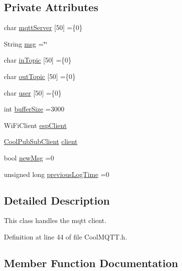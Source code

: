 \subsection*{Private Attributes}
\begin{DoxyCompactItemize}
\item 
char \hyperlink{class_cool_m_q_t_t_ab8bb951f87ddbf92db74c2ad16a3e53e}{mqtt\+Server} \mbox{[}50\mbox{]} =\{\textquotesingle{}0\textquotesingle{}\}
\item 
String \hyperlink{class_cool_m_q_t_t_af6b19e7074dbbb4ae493c44dcb53f7ff}{msg} =\char`\"{}\char`\"{}
\item 
char \hyperlink{class_cool_m_q_t_t_a4492f52a441e83cc5151010317fdb52d}{in\+Topic} \mbox{[}50\mbox{]} =\{\textquotesingle{}0\textquotesingle{}\}
\item 
char \hyperlink{class_cool_m_q_t_t_a109c786a17b463f9eeba046194279522}{out\+Topic} \mbox{[}50\mbox{]} =\{\textquotesingle{}0\textquotesingle{}\}
\item 
char \hyperlink{class_cool_m_q_t_t_a8cd47e45d457f908d4b4390b35aaee83}{user} \mbox{[}50\mbox{]} =\{\textquotesingle{}0\textquotesingle{}\}
\item 
int \hyperlink{class_cool_m_q_t_t_a7f3cf26b51d6770f216e42c5ef13ca9f}{buffer\+Size} =3000
\item 
Wi\+Fi\+Client \hyperlink{class_cool_m_q_t_t_acc30a0200967374a524092a8a806502a}{esp\+Client}
\item 
\hyperlink{class_cool_pub_sub_client}{Cool\+Pub\+Sub\+Client} \hyperlink{class_cool_m_q_t_t_afed1372683c44893b4668d0f1771f514}{client}
\item 
bool \hyperlink{class_cool_m_q_t_t_a3240388137b885775aadf38e96b24c6b}{new\+Msg} =0
\item 
unsigned long \hyperlink{class_cool_m_q_t_t_a3db37ef9ed3b05b2a8d44edba0e7d3cc}{previous\+Log\+Time} =0
\end{DoxyCompactItemize}


\subsection{Detailed Description}
This class handles the mqtt client. 

Definition at line 44 of file Cool\+M\+Q\+T\+T.\+h.



\subsection{Member Function Documentation}
\mbox{\label{class_cool_m_q_t_t_ac9248808641ebf3054ed0620ea9d0100}} 
